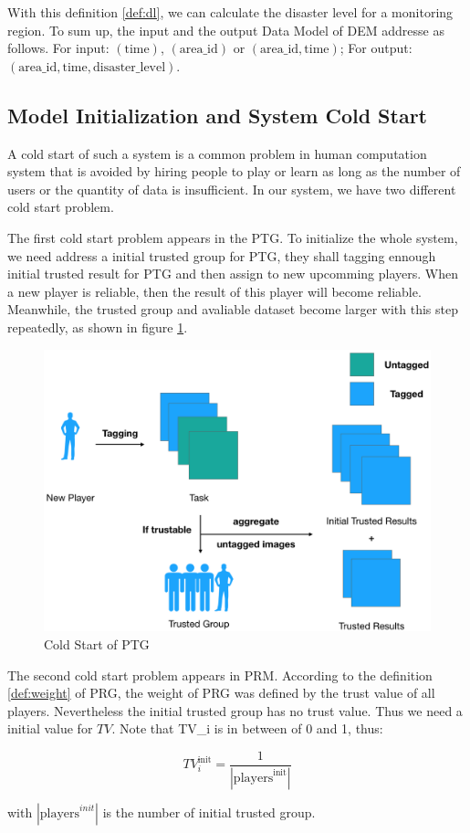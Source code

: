   With this definition \ref{def:dl}, we can calculate the disaster level for a monitoring region.
  To sum up, the input and the output Data Model of DEM addresse as follows. For input:
  $(\text{time})$, $(\text{area\_id})$ or $(\text{area\_id}, \text{time})$; For output:
  $(\text{area\_id}, \text{time}, \text{disaster\_level})$.

\subsection{Model Initialization and System Cold Start}

  A cold start of such a system is a common problem in human computation system that 
  is avoided by hiring people to play or learn as long as 
  the number of users or the quantity of data is insufficient.
  In our system, we have two different cold start problem.

  The first cold start problem appears in the PTG. To initialize the whole system, we need
  address a initial trusted group for PTG, they shall tagging ennough initial trusted result
  for PTG and then assign to new upcomming players. When a new player is reliable,
  then the result of this player will become reliable. Meanwhile, the trusted group and avaliable 
  dataset become larger with this step repeatedly, as shown in figure \ref{fig:cold}.

  \begin{figure}[htp]
  \centering
  \includegraphics[width=0.5\columnwidth]{figures/coldstart}
  \caption{Cold Start of PTG}
  \label{fig:cold}
  \end{figure}

  The second cold start problem appears in PRM. According to the definition \ref{def:weight} of PRG, the weight
  of PRG was defined by the trust value of all players. Nevertheless the initial trusted group has
  no trust value. Thus we need a initial value for $TV$. Note that TV\_i is in between of 0 and 1, thus:

  \[
  TV_{i}^{\text{init}} = \frac{1}{|\text{players}^{\text{init}}|}
  \]

  with $|\text{players}^{init}|$ is the number of initial trusted group. 